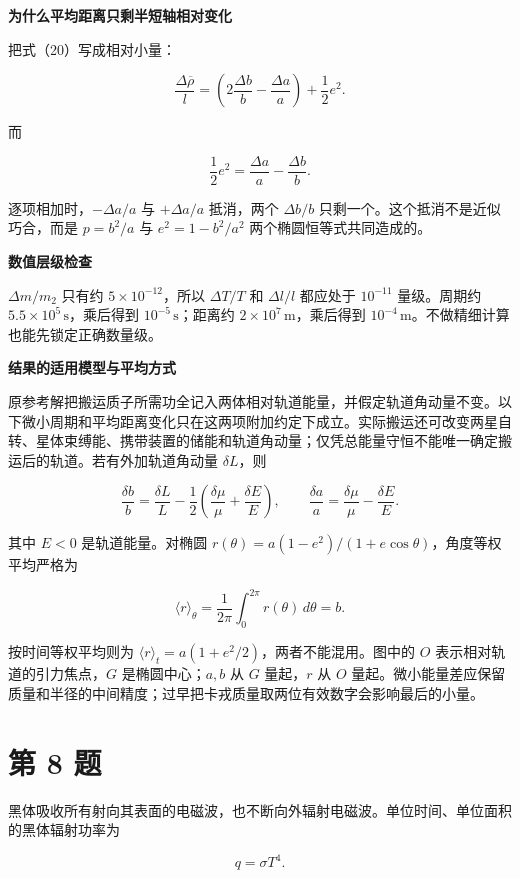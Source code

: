 \documentclass[12pt,a4paper,UTF8]{ctexart}
\begin{document}
\textbf{为什么平均距离只剩半短轴相对变化}

把式（20）写成相对小量：

\[
\frac{\Delta\overline\rho}{l}
=\left(2\frac{\Delta b}{b}-\frac{\Delta a}{a}\right)
+\frac12e^2.
\]

而

\[
\frac12e^2=\frac{\Delta a}{a}-\frac{\Delta b}{b}.
\]

逐项相加时，\(-\Delta a/a\) 与 \(+\Delta a/a\) 抵消，两个 \(\Delta b/b\)
只剩一个。这个抵消不是近似巧合，而是 \(p=b^2/a\) 与 \(e^2=1-b^2/a^2\)
两个椭圆恒等式共同造成的。

\textbf{数值层级检查}

\(\Delta m/m_2\) 只有约 \(5\times10^{-12}\)，所以 \(\Delta T/T\) 和
\(\Delta l/l\) 都应处于 \(10^{-11}\) 量级。周期约
\(5.5\times10^5\,\mathrm s\)，乘后得到 \(10^{-5}\,\mathrm s\)；距离约
\(2\times10^7\,\mathrm m\)，乘后得到
\(10^{-4}\,\mathrm m\)。不做精细计算也能先锁定正确数量级。

\textbf{结果的适用模型与平均方式}

原参考解把搬运质子所需功全记入两体相对轨道能量，并假定轨道角动量不变。以下微小周期和平均距离变化只在这两项附加约定下成立。实际搬运还可改变两星自转、星体束缚能、携带装置的储能和轨道角动量；仅凭总能量守恒不能唯一确定搬运后的轨道。若有外加轨道角动量
\(\delta L\)，则

\[\frac{\delta b}{b}=\frac{\delta L}{L}-\frac12\left(\frac{\delta\mu}{\mu}+\frac{\delta E}{E}\right),\qquad \frac{\delta a}{a}=\frac{\delta\mu}{\mu}-\frac{\delta E}{E}.\]

其中 \(E<0\) 是轨道能量。对椭圆
\(r(\theta)=a(1-e^2)/(1+e\cos\theta)\)，角度等权平均严格为

\[\langle r\rangle_\theta=\frac1{2\pi}\int_0^{2\pi}r(\theta)\,d\theta=b.\]

按时间等权平均则为
\(\langle r\rangle_t=a(1+e^2/2)\)，两者不能混用。图中的 \(O\)
表示相对轨道的引力焦点，\(G\) 是椭圆中心；\(a,b\) 从 \(G\) 量起，\(r\)
从 \(O\)
量起。微小能量差应保留质量和半径的中间精度；过早把卡戎质量取两位有效数字会影响最后的小量。

\newpage

\section{第 8 题}\label{ux7b2c-8-ux9898}

黑体吸收所有射向其表面的电磁波，也不断向外辐射电磁波。单位时间、单位面积的黑体辐射功率为

\[
q=\sigma T^4.
\]
\end{document}
